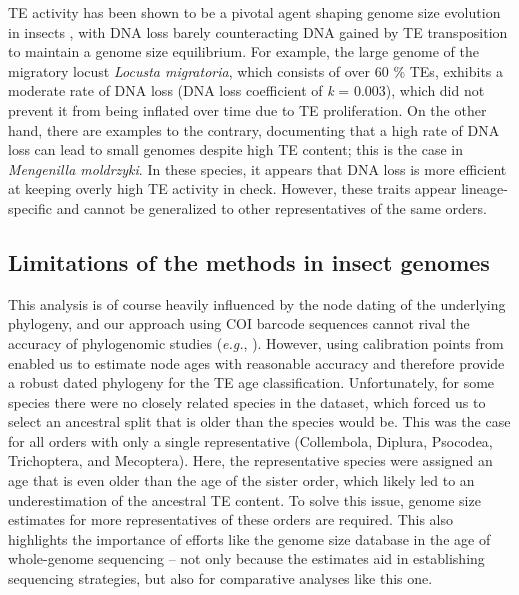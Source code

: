 TE activity has been shown to be a pivotal agent shaping genome size
evolution in insects \citep{Maumus2015}, with DNA loss barely
counteracting DNA gained by TE transposition to maintain a genome size
equilibrium. For example, the large genome of the migratory locust
\emph{Locusta migratoria}, which consists of over 60 \% TEs, exhibits a
moderate rate of DNA loss (DNA loss coefficient of \emph{k} = 0.003),
which did not prevent it from being inflated over time due to TE
proliferation. On the other hand, there are examples to the contrary,
documenting that a high rate of DNA loss can lead to small genomes
despite high TE content; this is the case in \emph{Mengenilla
moldrzyki}. In these species, it appears that DNA loss is more efficient
at keeping overly high TE activity in check. However, these traits
appear lineage-specific and cannot be generalized to other
representatives of the same orders.

\subsection*{Limitations of the methods in insect
genomes}

This analysis is of course heavily influenced by the node dating of the
underlying phylogeny, and our approach using COI barcode sequences
cannot rival the accuracy of phylogenomic studies (\emph{e.g.},
\citet{Misof2014}). However, using calibration points from
\citet{Misof2014} enabled us to estimate node ages with reasonable
accuracy and therefore provide a robust dated phylogeny for the TE age
classification. Unfortunately, for some species there were no closely
related species in the dataset, which forced us to select an ancestral
split that is older than the species would be. This was the case for all
orders with only a single representative (Collembola, Diplura, Psocodea,
Trichoptera, and Mecoptera). Here, the representative species were
assigned an age that is even older than the age of the sister order,
which likely led to an underestimation of the ancestral TE content. To
solve this issue, genome size estimates for more representatives of
these orders are required. This also highlights the importance of
efforts like the genome size database \citep{Gregory2018} in the age of
whole-genome sequencing -- not only because the estimates aid in
establishing sequencing strategies, but also for comparative analyses
like this one.

